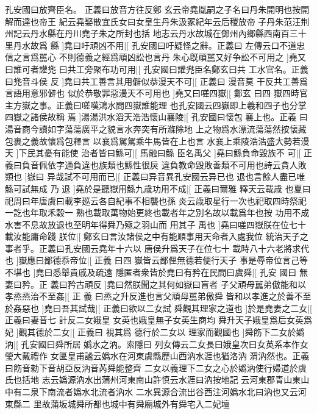 孔安國曰放齊臣名。%
正義曰放音方往反鄭%
%
玄云帝堯胤嗣之子名曰丹朱開明也按開解而達也帝王%
紀云堯娶散宜氏女曰女皇生丹朱汲冢紀年云后稷放帝%
%
子丹朱范汪荆州記云丹水縣在丹川堯子朱之所封也括%
地志云丹水故城在鄧州內鄉縣西南百三十里丹水故爲%
%
縣%
]堯曰吁頑凶不用|[%
孔安國曰吁疑怪之辭。正義曰%
左傳云口不道忠信之言爲嚚心%
%
不則德義之經爲頑凶訟也言丹%
朱心旣頑嚚又好争訟不可用之%
]堯又曰誰可者讙兠%
%
曰共工旁聚布功可用|[%
孔安國曰讙兠臣名鄭玄曰共%
工水官名。正義曰兠音斗侯%
%
反%
]堯曰共工善言其用僻似恭漫天不可|[%
正義曰%
漫音莫%
%
干反共工善爲言語用意邪僻也%
似於恭敬罪惡漫天不可用也%
]堯又曰嗟四嶽|[%
鄭玄%
曰四%
%
嶽四時官主方嶽之事。正義曰嗟嘆鴻水問四嶽誰能理%
也孔安國云四嶽即上羲和四子也分掌四嶽之諸侯故稱%
%
焉%
]湯湯洪水滔天浩浩懷山襄陵|[%
孔安國曰懷包%
襄上也。正義%
%
曰湯音商今讀如字蕩蕩廣平之貌言水奔突有所滌除地%
上之物爲水漂流蕩蕩然按懷藏包裹之義故懷爲包釋言%
%
以襄爲駕駕乘牛馬皆在上也言%
水襄上乘陵浩浩盛大勢若漫天%
]下民其憂有能使%
%
治者皆曰鯀可|[%
馬融曰鯀%
臣名禹父%
]堯曰鯀負命毀族不%
%
可|[%
正義曰負音佩依字通負違也族類也鯀性很戾%
違負教命毀敗善類不可用也詩云貪人敗類也%
]嶽曰%
%
异哉試不可用而已|[%
正義曰异音異孔安國云异已也%
退也言餘人盡已唯鯀可試無成%
%
乃%
退%
]堯於是聽嶽用鯀九歳功用不成|[%
正義曰爾雅%
釋天云載歳%
%
也夏曰祀周曰年唐虞曰載李廵云各自紀事不相襲也孫%
炎云歳取星行一次也祀取四時祭祀一訖也年取禾穀一%
%
熟也載取萬物始更終也載者年之別名故以載爲年也按%
功用不成水害不息故放退也至明年得舜乃殛之羽山而%
%
用其子%
禹也%
]堯曰嗟四嶽朕在位七十載汝能庸命踐%
%
朕位|[%
鄭玄曰言汝諸侯之中有能順事用天命者入處我位%
統治天子之事者乎。正義曰孔安國云堯年十六以%
%
唐侯升爲天子在位七十%
載時八十六老將求代也%
]嶽應曰鄙德忝帝位|[%
正義%
曰四%
%
嶽皆云鄙俚無德若便行天子%
事是辱帝位言己等不堪也%
]堯曰悉舉貴戚及疏遠%
%
隱匿者衆皆於堯曰有矜在民間曰虞舜|[%
孔安%
國曰%
%
無妻曰矜。正%
義曰矜古頑反%
]堯曰然朕聞之其何如嶽曰盲者%
%
子父頑母嚚弟傲能和以孝烝烝治不至姦|[%
正%
義%
%
曰烝之升反進也言父頑母嚚弟傲舜%
皆和以孝進之於善不至於姦惡也%
]堯曰吾其試哉|[%
%
正義曰欲以二女試%
舜觀其理家之道也%
]於是堯妻之二女|[%
正義曰妻音七%
計反二女娥皇%
%
女英也娥皇無子女英生商均%
舜升天子娥皇爲后女英爲妃%
]觀其德於二女|[%
正義曰%
視其爲%
%
德行於二女以%
理家而觀國也%
]舜飭下二女於嬀汭|[%
孔安國曰舜所居%
嬀水之汭。索隱曰%
%
列女傳云二女長曰娥皇次曰女英系本作女瑩大戴禮作%
女匽皇甫謐云嬀水在河東虞縣歷山西汭水涯也猶洛汭%
%
渭汭然也。正義曰飭音勑下音胡亞反汭音芮舜能整齊%
二女以義理下二女之心於嬀汭使行婦道於虞氏也括地%
%
志云嬀源汭水出蒲州河東南山許慎云水涯曰汭按地記%
云河東郡青山東山中有二泉下南流者嬀水北流者汭水%
%
二水異源合流出谷西注河嬀水北曰汭也又云河東縣二%
里故蒲坂城舜所都也城中有舜廟城外有舜宅入二妃壇%
